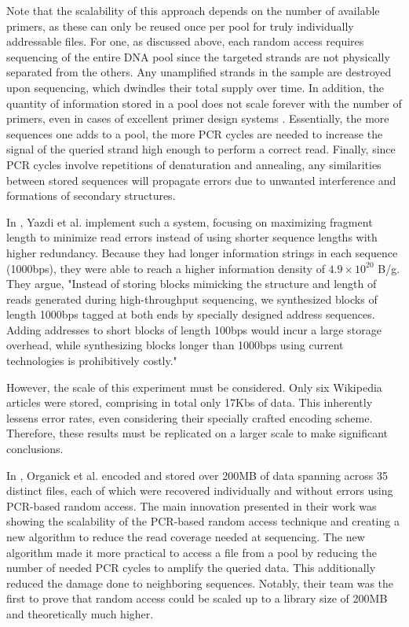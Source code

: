 \documentclass[a4paper,conference]{IEEEtran}
\begin{document}
Note that the scalability of this approach depends on the number of available primers, as these can only be reused once per pool for truly individually addressable files. For one, as discussed above, each random access requires sequencing of the entire DNA pool since the targeted strands are not physically separated from the others. Any unamplified strands in the sample are destroyed upon sequencing, which dwindles their total supply over time. In addition, the quantity of information stored in a pool does not scale forever with the number of primers, even in cases of excellent primer design systems \cite{}. Essentially, the more sequences one adds to a pool, the more PCR cycles are needed to increase the signal of the queried strand high enough to perform a correct read. Finally, since PCR cycles involve repetitions of denaturation and annealing, any similarities between stored sequences will propagate errors due to unwanted interference and formations of secondary structures.

In \cite{pcrbased2}, Yazdi et al. implement such a system, focusing on maximizing fragment length to minimize read errors instead of using shorter sequence lengths with higher redundancy. Because they had longer information strings in each sequence (1000bps), they were able to reach a higher information density of $4.9 \times 10^{20}$ B/g. They argue, "Instead of storing blocks mimicking the structure and length of reads generated during high-throughput sequencing, we synthesized blocks of length 1000bps tagged at both ends by specially designed address sequences. Adding addresses to short blocks of length 100bps would incur a large storage overhead, while synthesizing blocks longer than 1000bps using current technologies is prohibitively costly."

However, the scale of this experiment must be considered. Only six Wikipedia articles were stored, comprising in total only 17Kbs of data. This inherently lessens error rates, even considering their specially crafted encoding scheme. Therefore, these results must be replicated on a larger scale to make significant conclusions. 

In \cite{pcrbased}, Organick et al. encoded and stored over 200MB of data spanning across 35 distinct files, each of which were recovered individually and without errors using PCR-based random access. The main innovation presented in their work was showing the scalability of the PCR-based random access technique and creating a new algorithm to reduce the read coverage needed at sequencing. The new algorithm made it more practical to access a file from a pool by reducing the number of needed PCR cycles to amplify the queried data. This additionally reduced the damage done to neighboring sequences. Notably, their team was the first to prove that random access could be scaled up to a library size of 200MB and theoretically much higher.
\end{document}
